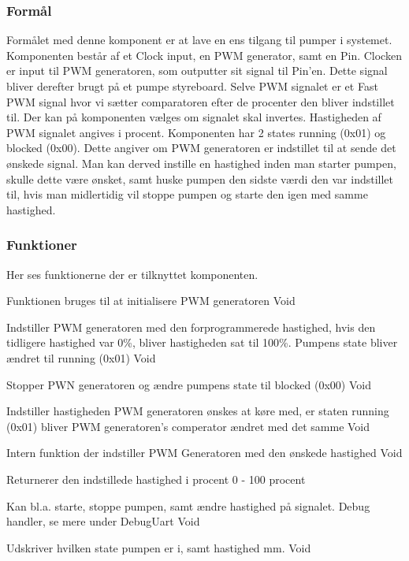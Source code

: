 \subsubsection{Formål}
Formålet med denne komponent er at lave en ens tilgang 
til pumper i systemet. Komponenten består af et Clock 
input, en PWM generator, samt en Pin. Clocken er input 
til PWM generatoren, som outputter sit signal til Pin'en. 
Dette signal bliver derefter brugt på et pumpe 
styreboard. Selve PWM signalet er et Fast PWM signal 
hvor vi sætter comparatoren efter de procenter den 
bliver indstillet til. Der kan på komponenten vælges om 
signalet skal invertes. Hastigheden af PWM signalet 
angives i procent. Komponenten har 2 states running (0x01) 
og blocked (0x00). Dette angiver om PWM generatoren er 
indstillet til at sende det ønskede signal. 
Man kan derved instille en hastighed inden man starter 
pumpen, skulle dette være ønsket, samt huske pumpen den 
sidste værdi den var indstillet til, hvis man midlertidig 
vil stoppe pumpen og starte den igen med samme hastighed.

\subsubsection{Funktioner}
Her ses funktionerne der er tilknyttet komponenten.

{Funktionen bruges til at initialisere PWM generatoren}
{Void}
{}

{Indstiller PWM generatoren med den forprogrammerede hastighed, hvis den tidligere hastighed var 0\%, bliver hastigheden sat til 100\%. Pumpens state bliver ændret til running (0x01)}
{Void}
{}

{Stopper PWN generatoren og ændre pumpens state til blocked (0x00)}
{Void}
{}

{Indstiller hastigheden PWM generatoren ønskes at køre med, er staten running (0x01) bliver PWM generatoren's comperator ændret med det samme}
{Void}
{
}

{Intern funktion der indstiller PWM Generatoren med den ønskede hastighed}
{Void}
{}

{Returnerer den indstillede hastighed i procent}
{0 - 100 procent}
{}

{Kan bl.a. starte, stoppe pumpen, samt ændre hastighed på signalet. Debug handler, se mere under DebugUart}
{Void}
{
}

{Udskriver hvilken state pumpen er i, samt hastighed mm.}
{Void}
{}